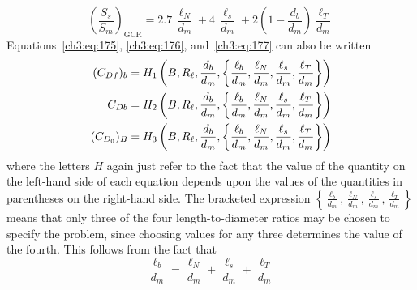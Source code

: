\begin{equation}\label{ch3:eq:184}
\left(\frac{S_s}{S_m}\right)_{\mathrm{GCR}} = 2.7\,\frac{\ell_N}{d_m} + 4\,\frac{\ell_s}{d_m}
  + 2\left(1 - \frac{d_b}{d_m}\right)\frac{\ell_T}{d_m}
\end{equation}
Equations~\eqref{ch3:eq:175}, \eqref{ch3:eq:176}, and~\eqref{ch3:eq:177} can also be written
\begin{align}
(C_{Df})_b &= H_1\left(B, R_\ell, \frac{d_b}{d_m}, \left\{\frac{\ell_b}{d_m}, \frac{\ell_N}{d_m},
  \frac{\ell_s}{d_m}, \frac{\ell_T}{d_m}\right\}\right) \label{ch3:eq:185}\\
C_{Db} &= H_2\left(B, R_\ell, \frac{d_b}{d_m}, \left\{\frac{\ell_b}{d_m}, \frac{\ell_N}{d_m},
  \frac{\ell_s}{d_m}, \frac{\ell_T}{d_m}\right\}\right) \label{ch3:eq:186}\\
(C_{D_0})_B &= H_3\left(B, R_\ell, \frac{d_b}{d_m}, \left\{\frac{\ell_b}{d_m}, \frac{\ell_N}{d_m},
  \frac{\ell_s}{d_m}, \frac{\ell_T}{d_m}\right\}\right) \label{ch3:eq:187}
\end{align}
where the letters $H$ again just refer to the fact that the value of the quantity on the left-hand
side of each equation depends upon the values of the quantities in parentheses on the right-hand
side. The bracketed expression $\left\{\frac{\ell_b}{d_m}, \frac{\ell_N}{d_m}, \frac{\ell_s}{d_m},
\frac{\ell_T}{d_m}\right\}$ means that only three of the four length-to-diameter ratios may be
chosen to specify the problem, since choosing values for any three determines the value of the
fourth. This follows from the fact that
\begin{equation}\label{ch3:eq:188}
\frac{\ell_b}{d_m} = \frac{\ell_N}{d_m} + \frac{\ell_s}{d_m} + \frac{\ell_T}{d_m}
\end{equation}

